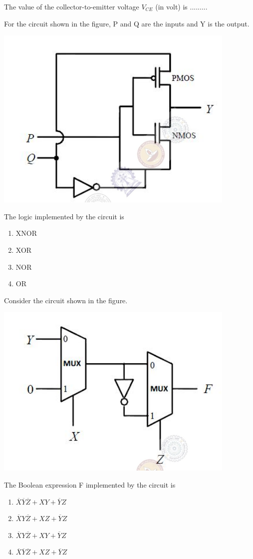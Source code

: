 The value of the collector-to-emitter voltage $V_{CE}$ (in volt) is .........

\item For the circuit shown in the figure, P and Q are the inputs and Y is the output.

\includegraphics[scale=0.3]{15}

The logic implemented by the circuit is 
\begin{enumerate}
\item XNOR
\item XOR
\item NOR
\item OR
\end{enumerate}

\item Consider the circuit shown in the figure.

\includegraphics[scale=0.3]{16}

The Boolean expression F implemented by the circuit is 
\begin{enumerate}
\item $\overline{X} \overline{Y} \overline{Z} + XY + \overline{Y}Z$ 
\item $\overline{X} Y \overline{Z} + XZ + \overline{Y}Z$
\item $\overline{X} Y \overline{Z} + XY + \overline{Y}Z$
\item $\overline{X} \overline{Y} \overline{Z} + XZ + \overline{Y}Z$
\end{enumerate}

